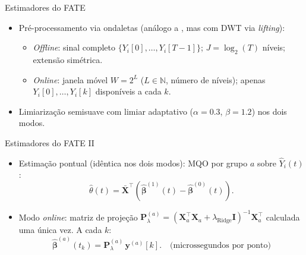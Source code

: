 \documentclass{beamer}
\begin{document}
\begin{frame}{Estimadores do FATE}
\begin{itemize}
    \item Pré-processamento via ondaletas (análogo a , mas com DWT via \textit{lifting}):
    \begin{itemize}
        \item \textit{Offline}: sinal completo \(\{Y_i[0],\ldots,Y_i[T{-}1]\}\); \(J = \log_2(T)\) níveis; extensão simétrica.
        \item \textit{Online}: janela móvel \(W = 2^L\) (\(L \in \mathbb{N}\), número de níveis); apenas \(Y_i[0], \ldots, Y_i[k]\) disponíveis a cada \(k\).
    \end{itemize}
    \item Limiarização semisuave com limiar adaptativo (\(\alpha{=}0.3\), \(\beta{=}1.2\)) nos dois modos.
\end{itemize}
\end{frame}

\begin{frame}{Estimadores do FATE II}
\begin{itemize}
    \item Estimação pontual (idêntica nos dois modos): MQO por grupo \(a\) sobre \(\hat{Y}_i(t)\):
    \[
        \hat{\theta}(t) = \bar{\mathbf{X}}^\top\!\left(\hat{\boldsymbol{\beta}}^{(1)}(t) - \hat{\boldsymbol{\beta}}^{(0)}(t)\right).
    \]
    \item Modo \textit{online}: matriz de projeção \(\mathbf{P}^{(a)}_\lambda = (\mathbf{X}_a^\top\mathbf{X}_a + \lambda_\text{Ridge}\mathbf{I})^{-1}\mathbf{X}_a^\top\) calculada uma única vez. A cada \(k\):
    \[
        \hat{\boldsymbol{\beta}}^{(a)}(t_k) = \mathbf{P}^{(a)}_\lambda\,\mathbf{y}^{(a)}[k]. \quad \text{(microssegundos por ponto)}
    \]
\end{itemize}
\end{frame}
\end{document}
